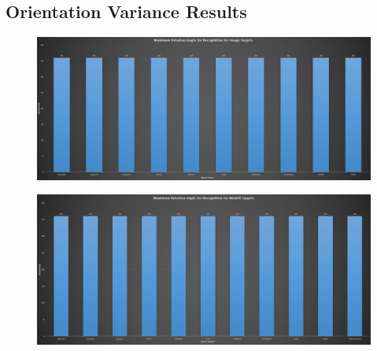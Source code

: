 \documentclass{aifyp}
\begin{document}
\begin{appendices}
\section{Orientation Variance Results}
\begin{figure}[H]
    \centering
    \includegraphics[scale=0.42]{Images/Chapter6/MaximumRotationImageTargets.JPG}
    \label{fig:ImageTargetRotationBarchart}
\end{figure}
\begin{figure}[H]
    \centering
    \includegraphics[scale=0.42]{Images/Chapter6/MaximumRotationModelTargets.JPG}
    \label{fig:ModelTargetRotationBarchart}
\end{figure}

\end{appendices}
\end{document}
